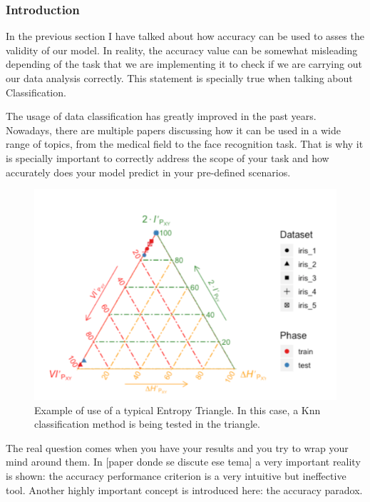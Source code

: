 \subsubsection{Introduction}

In the previous section I have talked about how accuracy can be used to asses the validity of our model. In reality, the accuracy value can be somewhat misleading depending of the task that we are implementing it to check if we are carrying out our data analysis correctly. This statement is specially true when talking about Classification.\par

The usage of data classification has greatly improved in the past years. Nowadays, there are multiple papers discussing how it can be used in a wide range of topics, from the medical field to the face recognition task. That is why it is specially important to correctly address the scope of your task and how accurately does your model predict in your pre-defined scenarios.\par

\begin{figure}[H]
 \centering
  \includegraphics[width=15cm]{Figuras_tfg/Example_ET}
  \caption{Example of use of a typical Entropy Triangle. In this case, a Knn classification method is being tested in the triangle.}
 \label{fig:figure_example_et}
\end{figure} 

The real question comes when you have your results and you try to wrap your mind around them. In [paper donde se discute ese tema] a very important reality is shown: the accuracy performance criterion is a very intuitive but ineffective tool. Another highly important concept is introduced here: the accuracy paradox.\par  


